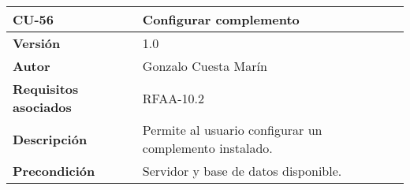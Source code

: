 \begin{longtable}[]{@{}ll@{}}
\toprule
\begin{minipage}[b]{0.21\columnwidth}\raggedright
\textbf{CU-56}\strut
\end{minipage} & \begin{minipage}[b]{0.73\columnwidth}\raggedright
\textbf{Configurar complemento}\strut
\end{minipage}\tabularnewline
\midrule
\endhead
\begin{minipage}[t]{0.21\columnwidth}\raggedright
\textbf{Versión}\strut
\end{minipage} & \begin{minipage}[t]{0.73\columnwidth}\raggedright
1.0\strut
\end{minipage}\tabularnewline
\begin{minipage}[t]{0.21\columnwidth}\raggedright
\textbf{Autor}\strut
\end{minipage} & \begin{minipage}[t]{0.73\columnwidth}\raggedright
Gonzalo Cuesta Marín\strut
\end{minipage}\tabularnewline
\begin{minipage}[t]{0.21\columnwidth}\raggedright
\textbf{Requisitos asociados}\strut
\end{minipage} & \begin{minipage}[t]{0.73\columnwidth}\raggedright
RFAA-10.2\strut
\end{minipage}\tabularnewline
\begin{minipage}[t]{0.21\columnwidth}\raggedright
\textbf{Descripción}\strut
\end{minipage} & \begin{minipage}[t]{0.73\columnwidth}\raggedright
Permite al usuario configurar un complemento instalado.\strut
\end{minipage}\tabularnewline
\begin{minipage}[t]{0.21\columnwidth}\raggedright
\textbf{Precondición}\strut
\end{minipage} & \begin{minipage}[t]{0.73\columnwidth}\raggedright
Servidor y base de datos disponible.


\end{minipage}
\end{longtable}
